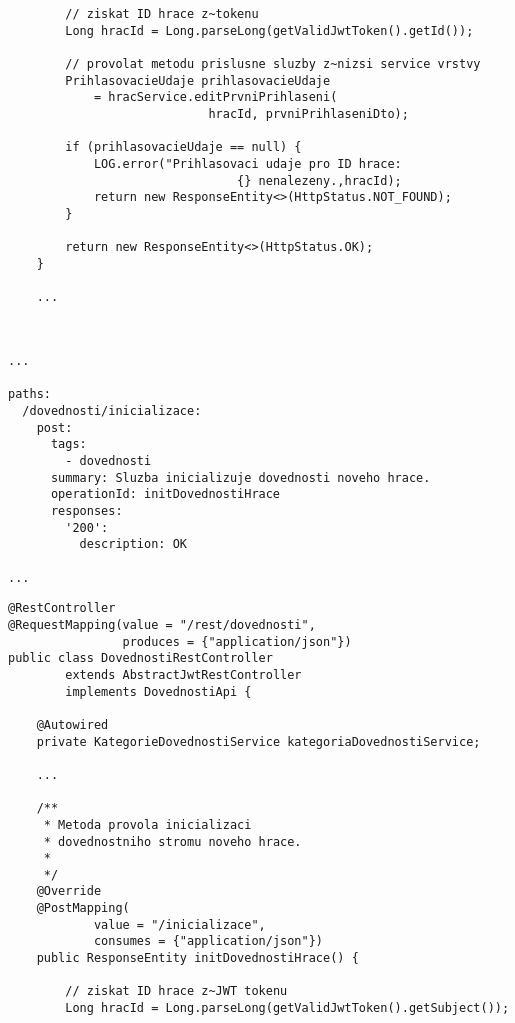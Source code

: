 \documentclass[12pt]{article}
\begin{document}
{\begin{lstlisting}
        // ziskat ID hrace z~tokenu
        Long hracId = Long.parseLong(getValidJwtToken().getId());

        // provolat metodu prislusne sluzby z~nizsi service vrstvy
        PrihlasovacieUdaje prihlasovacieUdaje
            = hracService.editPrvniPrihlaseni(
                            hracId, prvniPrihlaseniDto);

        if (prihlasovacieUdaje == null) {
            LOG.error("Prihlasovaci udaje pro ID hrace:
                                {} nenalezeny.,hracId);
            return new ResponseEntity<>(HttpStatus.NOT_FOUND);
        }

        return new ResponseEntity<>(HttpStatus.OK);
    }
    
    ...
    
\end{lstlisting}



\begin{lstlisting}

...

paths:
  /dovednosti/inicializace:
    post:
      tags:
        - dovednosti
      summary: Sluzba inicializuje dovednosti noveho hrace.
      operationId: initDovednostiHrace
      responses:
        '200':
          description: OK

...

\end{lstlisting}


\begin{lstlisting}
@RestController
@RequestMapping(value = "/rest/dovednosti",
                produces = {"application/json"})
public class DovednostiRestController 
        extends AbstractJwtRestController 
        implements DovednostiApi {

    @Autowired
    private KategorieDovednostiService kategoriaDovednostiService;
    
    ...

    /**
     * Metoda provola inicializaci
     * dovednostniho stromu noveho hrace.
     * 
     */
    @Override
    @PostMapping(
            value = "/inicializace",
            consumes = {"application/json"})
    public ResponseEntity initDovednostiHrace() {
        
        // ziskat ID hrace z~JWT tokenu
        Long hracId = Long.parseLong(getValidJwtToken().getSubject());


\end{lstlisting}}
\end{document}

